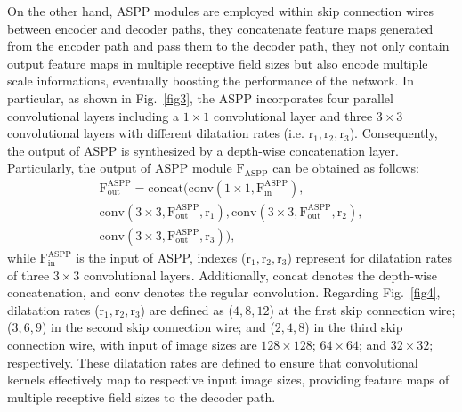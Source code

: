 \documentclass[conference]{IEEEtran} %
\begin{document}
On the other hand, ASPP modules \cite{ChenAtrous} are employed within skip connection wires between encoder and decoder paths, they concatenate feature maps generated from the encoder path and pass them to the decoder path, they not only contain output feature maps in multiple receptive field sizes but also encode multiple scale informations, eventually boosting the performance of the network. In particular, as shown in Fig.~\ref{fig3}, the ASPP incorporates four parallel convolutional layers including a $\mathrm{1\times1}$ convolutional layer and three $\mathrm{3\times3}$ convolutional layers with different dilatation rates (i.e. $\mathrm{r_1, r_2, r_3}$). Consequently, the output of ASPP is synthesized by a depth-wise concatenation layer. Particularly, the output of ASPP module $\mathrm{F_{\text{ASPP}}}$ can be obtained as follows:
\begin{equation}
\begin{aligned}
    \mathrm{F}^\text{ASPP}_\text{out} =  \text{concat} (\text{conv}(1\times1,\mathrm{F}^\text{ASPP}_\text{in}), \\ 
     \mathrm{conv(3\times3,F^\text{ASPP}_\text{out},r_1)},\mathrm{conv(3 \times 3,F^\text{ASPP}_\text{out},r_2)}, \\ \mathrm{conv(3\times3,F^\text{ASPP}_\text{out},r_3))},
    \label{eq:ASPP}
\end{aligned}
\end{equation}
while $\mathrm{F}^\text{ASPP}_\text{in}$ is the input of ASPP, indexes ($\mathrm{r_1, r_2, r_3}$) represent for dilatation rates of three $\mathrm{3\times3}$ convolutional layers. Additionally, $\text{concat}$ denotes the depth-wise concatenation, and $\mathrm{conv}$ denotes the regular convolution. Regarding Fig.~\ref{fig4}, dilatation rates ($\mathrm{r_1, r_2, r_3}$) are defined as ($4, 8, 12$) at the first skip connection wire; ($3, 6, 9$) in the second skip connection wire; and ($2, 4, 8$) in the third skip connection wire, with input of image sizes are $128\times128$; $64\times64$; and $32\times32$; respectively. These dilatation rates are defined to ensure that convolutional kernels effectively map to respective input image sizes, providing feature maps of multiple receptive field sizes to the decoder path.
\end{document}
